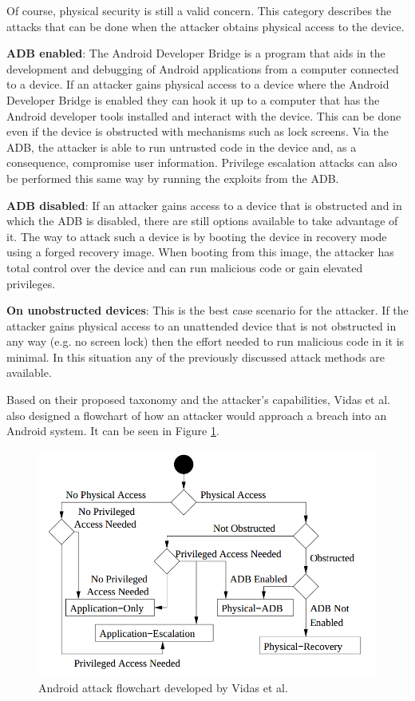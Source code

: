 \documentclass[conference]{IEEEtran}
\begin{document}
Of course, physical security is still a valid concern. This category describes the attacks that can be done when the attacker obtains physical access to the device.

\textbf{ADB enabled}: The Android Developer Bridge is a program that aids in the development and debugging of Android applications from a computer connected to a device. If an attacker gains physical access to a device where the Android Developer Bridge is enabled they can hook it up to a computer that has the Android developer tools installed and interact with the device. This can be done even if the device is obstructed with mechanisms such as lock screens. Via the ADB, the attacker is able to run untrusted code in the device and, as a consequence, compromise user information. Privilege escalation attacks can also be performed this same way by running the exploits from the ADB.

\textbf{ADB disabled}: If an attacker gains access to a device that is obstructed and in which the ADB is disabled, there are still options available to take advantage of it. The way to attack such a device is by booting the device in recovery mode using a forged recovery image. When booting from this image, the attacker has total control over the device and can run malicious code or gain elevated privileges.

\textbf{On unobstructed devices}: This is the best case scenario for the attacker. If the attacker gains physical access to an unattended device that is not obstructed in any way (e.g. no screen lock) then the effort needed to run malicious code in it is minimal. In this situation any of the previously discussed attack methods are available.

Based on their proposed taxonomy and the attacker's capabilities, Vidas et al. also designed a flowchart of how an attacker would approach a breach into an Android system. It can be seen in Figure \ref{fig:attackflow}.

\begin{figure}
  \centering
  \includegraphics[scale=0.30]{figs/attackflow.png}
  \caption{Android attack flowchart developed by Vidas et al.}
  \label{fig:attackflow}
\end{figure}
\end{document}
